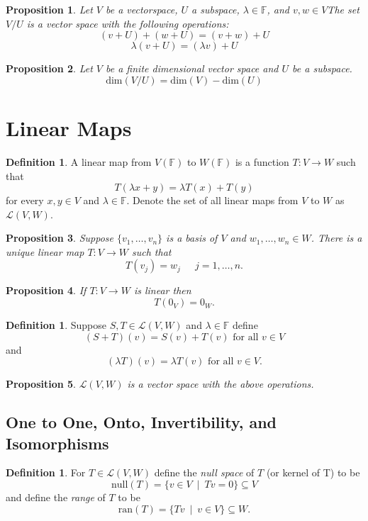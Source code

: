 \documentclass[12pt,letterpaper]{article}
\theoremstyle{plain}
\newtheorem{proposition}{Proposition}[section]
\theoremstyle{definition}
\newtheorem{definition}[theorem]{Definition}
\numberwithin{equation}{section}
\begin{document}
\begin{proposition} Let $V$ be a vectorspace, $U$ a subspace, $\lambda\in \mathbb{F}$, and $v,w\in V$The set $V/U$ is a vector space with the following operations: 
\[(v+U)+(w+U)=(v+w)+U\]
\[\lambda(v+U)=(\lambda v)+U\]
\end{proposition}


\begin{proposition} Let $V$ be a finite dimensional vector space and $U$ be a subspace. 
\[\text{dim}(V/U)=\text{dim}(V)-\text{dim}(U)\]
\end{proposition}

\section{Linear Maps}
\begin{definition} A linear map from $V(\mathbb{F})$ to $W(\mathbb{F})$ is a function $T:V\rightarrow W$ such that 
\[T(\lambda x+y)=\lambda T(x)+T(y)\]
for every $x,y\in V$ and $\lambda\in \mathbb{F}$. Denote the set of all linear maps from $V$ to $W$ as $\mathcal{L}(V,W)$. 
\end{definition}
\begin{proposition} Suppose $\{v_1,\ldots, v_n\}$ is a basis of $V$ and $w_1,\ldots,w_n\in W$. There is a unique linear map $T:V\rightarrow W$ such that 
\[T(v_j)=w_j\ \quad \ j=1,\ldots, n.\]
\end{proposition}

\begin{proposition} If $T:V\rightarrow W$ is linear then 
\[T(0_V)=0_W.\]
\end{proposition}

\begin{definition} Suppose $S, T\in \mathcal{L}(V,W)$ and $\lambda \in \mathbb{F}$ define 
\[(S+T)(v)=S(v)+T(v) \text{ for all }v\in V\]
and
\[(\lambda T)(v)=\lambda T(v) \text{ for all }v\in V.\]
\end{definition}
\begin{proposition} $\mathcal{L}(V,W)$ is a vector space with the above operations.
\end{proposition}
\subsection{One to One, Onto, Invertibility, and Isomorphisms}
\begin{definition} For $T\in \mathcal{L}(V,W)$ define the \emph{null space} of $T$ (or kernel of T) to be 
\[\text{null}(T)=\{v\in V\ \mid \  Tv=0\}\subseteq V\]
and define the \emph{range} of $T$ to be 
\[\text{ran}(T)=\{Tv\ \mid \  v\in V\}\subseteq W.\]
\end{definition}
\end{document}
